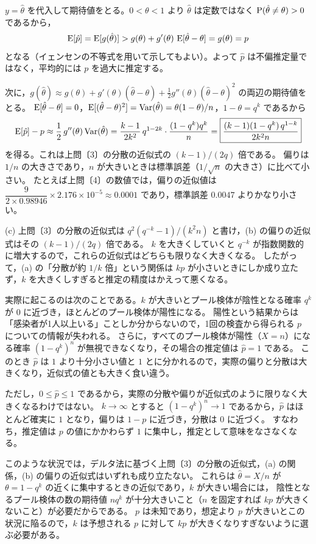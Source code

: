 \documentclass[a4paper,11pt]{ltjsarticle}
\begin{document}
$y=\hat\theta$ を代入して期待値をとる。$0<\theta<1$ より $\hat\theta$ は定数ではなく $\operatorname{P}(\hat\theta\ne\theta)>0$ であるから，
\[
\operatorname{E}[\hat p]=\operatorname{E}[g(\hat\theta)]>g(\theta)+g'(\theta)\,\operatorname{E}[\hat\theta-\theta]=g(\theta)=p
\]
となる（イェンセンの不等式を用いて示してもよい）。よって $\hat p$ は不偏推定量ではなく，平均的には $p$ を過大に推定する。

次に，$g(\hat\theta)\approx g(\theta)+g'(\theta)(\hat\theta-\theta)+\frac12g''(\theta)(\hat\theta-\theta)^2$ の両辺の期待値をとる。
$\operatorname{E}[\hat\theta-\theta]=0$，$\operatorname{E}[(\hat\theta-\theta)^2]=\operatorname{Var}(\hat\theta)=\theta(1-\theta)/n$，$1-\theta=q^k$ であるから
\[
\operatorname{E}[\hat p]-p\approx\frac12\,g''(\theta)\operatorname{Var}(\hat\theta)
=\frac{k-1}{2k^2}\,q^{1-2k}\cdot\frac{(1-q^k)q^k}{n}
=\boxed{\frac{(k-1)(1-q^k)\,q^{1-k}}{2k^2n}}
\]
を得る。これは上問〔3〕の分散の近似式の $(k-1)/(2q)$ 倍である。
偏りは $1/n$ の大きさであり，$n$ が大きいときは標準誤差（$1/\sqrt n$ の大きさ）に比べて小さい。
たとえば上問〔4〕の数値では，偏りの近似値は $\dfrac{9}{2\times0.98946}\times2.176\times10^{-5}\approx0.0001$ であり，標準誤差 $0.0047$ よりかなり小さい。

(c) 上問〔3〕の分散の近似式は $q^2(q^{-k}-1)/(k^2n)$ と書け，(b) の偏りの近似式はその $(k-1)/(2q)$ 倍である。
$k$ を大きくしていくと $q^{-k}$ が指数関数的に増大するので，これらの近似式はどちらも限りなく大きくなる。
したがって，(a) の「分散が約 $1/k$ 倍」という関係は $kp$ が小さいときにしか成り立たず，$k$ を大きくしすぎると推定の精度はかえって悪くなる。

実際に起こるのは次のことである。$k$ が大きいとプール検体が陰性となる確率 $q^k$ が $0$ に近づき，ほとんどのプール検体が陽性になる。
陽性という結果からは「感染者が1人以上いる」ことしか分からないので，1回の検査から得られる $p$ についての情報が失われる。
さらに，すべてのプール検体が陽性（$X=n$）になる確率 $(1-q^k)^n$ が無視できなくなり，その場合の推定値は $\hat p=1$ である。
このとき $\hat p$ は $1$ より十分小さい値と $1$ とに分かれるので，実際の偏りと分散は大きくなり，近似式の値とも大きく食い違う。

ただし，$0\le\hat p\le1$ であるから，実際の分散や偏りが近似式のように限りなく大きくなるわけではない。
$k\to\infty$ とすると $(1-q^k)^n\to1$ であるから，$\hat p$ はほとんど確実に $1$ となり，偏りは $1-p$ に近づき，分散は $0$ に近づく。
すなわち，推定値は $p$ の値にかかわらず $1$ に集中し，推定として意味をなさなくなる。

このような状況では，デルタ法に基づく上問〔3〕の分散の近似式，(a) の関係，(b) の偏りの近似式はいずれも成り立たない。
これらは $\hat\theta=X/n$ が $\theta=1-q^k$ の近くに集中するときの近似であり，$k$ が大きい場合には，
陰性となるプール検体の数の期待値 $nq^k$ が十分大きいこと（$n$ を固定すれば $kp$ が大きくないこと）が必要だからである。
$p$ は未知であり，想定より $p$ が大きいとこの状況に陥るので，$k$ は予想される $p$ に対して $kp$ が大きくなりすぎないように選ぶ必要がある。
\end{document}
